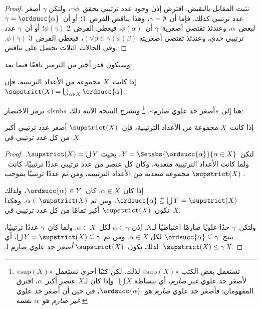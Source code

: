 \documentclass[../../../include/open-logic-section]{subfiles}
\begin{document}
\begin{proof}
نثبت المقابل بالنقيض. افترض إذن وجود عدد ترتيبي يحقق~$\lnot\phi$، ولتكن
$\gamma$ أصغر عدد ترتيبي كذلك. فإما أن~$\gamma = \emptyset$، وهذا
يناقض الفرض~1؛ أو أن~$\gamma = \ordsucc{\alpha}$ لبعض~$\alpha$،
وعندئذ تقتضي أصغرية~$\gamma$ أن~$\phi(\alpha)$، فيعطي الفرض~2
$\phi(\gamma)$؛ أو أن~$\gamma$ عدد ترتيبي حدي، وعندئذ تقتضي أصغريته
$(\forall \beta \in \gamma)\phi(\beta)$، فيعطي الفرض~3
$\phi(\gamma)$. وفي الحالات الثلاث نحصل على تناقض.
\end{proof}
\noindent
وسيكون قدر أخير من الترميز نافعًا فيما بعد:

\begin{defn}
إذا كانت~$X$ مجموعة من الأعداد الترتيبية، فإن
$\supstrict(X) = \bigcup_{\alpha \in X} \ordsucc{\alpha}$.
\end{defn}
\noindent
يرمز الاختصار «lsub» هنا إلى «أصغر حد علوي صارم».
\footnote{تستعمل بعض الكتب «$\text{sup}(X)$» لذلك. لكن كتبًا أخرى
تستعمل «$\text{sup}(X)$» لأصغر حد علوي \emph{غير صارم}، أي ببساطة
$\bigcup X$. وإذا كان لـ$X$ عنصر أكبر~$\alpha$، افترق المفهومان:
فأصغر حد علوي \emph{صارم} هو~$\ordsucc{\alpha}$، في حين أن أصغر حد
علوي \emph{غير صارم} هو~$\alpha$ نفسه.}
وتشرح النتيجة الآتية ذلك:

\begin{prop}
إذا كانت~$X$ مجموعة من الأعداد الترتيبية، فإن~$\supstrict(X)$ أصغر
عدد ترتيبي أكبر من كل عدد ترتيبي في~$X$.
\end{prop}

\begin{proof}
لتكن~$Y = \Setabs{\ordsucc{\alpha}}{\alpha \in X}$، بحيث
$\supstrict(X) = \bigcup Y$. ولما كانت الأعداد الترتيبية متعدية، وكان
كل عنصر من عدد ترتيبي عددًا ترتيبيًا، كانت~$\supstrict(X)$ مجموعة
متعدية من الأعداد الترتيبية، ومن ثم عددًا ترتيبيًا بموجب
.

إذا كان~$\alpha \in X$، كان~$\ordsucc{\alpha} \in Y$، ولذلك
$\ordsucc{\alpha} \subseteq \bigcup Y = \supstrict(X)$، ومن ثم
$\alpha \in \supstrict(X)$. وهكذا تكون~$\supstrict(X)$ أكبر تمامًا
من كل عدد ترتيبي في~$X$.

ولتكن~$\gamma$ حدًا علويًا صارمًا اعتباطيًا لـ$X$. إذن
$\alpha \in \gamma$ لكل~$\alpha \in X$. ولما كان~$\gamma$ عددًا
ترتيبيًا، ينتج~$\ordsucc{\alpha} \subseteq \gamma$ لكل
$\alpha \in X$. ومن ثم
$\bigcup Y = \supstrict(X) \subseteq \gamma$، أي
$\supstrict(X) \leq \gamma$. لذلك تكون~$\supstrict(X)$ \emph{أصغر} حد علوي
صارم لـ$X$.
\end{proof}
\end{document}
